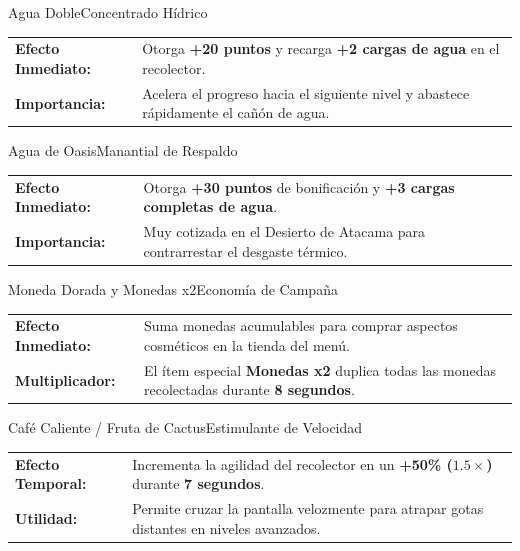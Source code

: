 \documentclass[11pt,a4paper]{article}
\begin{document}
\vspace{0.3cm}

\begin{tarjetaitem}{Agua Doble}{Concentrado Hídrico}
    \begin{tabularx}{\textwidth}{lX}
        \textbf{Efecto Inmediato:} & Otorga \textbf{+20 puntos} y recarga \textbf{+2 cargas de agua} en el recolector. \\
        \textbf{Importancia:} & Acelera el progreso hacia el siguiente nivel y abastece rápidamente el cañón de agua.
    \end{tabularx}
\end{tarjetaitem}

\vspace{0.3cm}

\begin{tarjetaitem}{Agua de Oasis}{Manantial de Respaldo}
    \begin{tabularx}{\textwidth}{lX}
        \textbf{Efecto Inmediato:} & Otorga \textbf{+30 puntos} de bonificación y \textbf{+3 cargas completas de agua}. \\
        \textbf{Importancia:} & Muy cotizada en el Desierto de Atacama para contrarrestar el desgaste térmico.
    \end{tabularx}
\end{tarjetaitem}

\vspace{0.3cm}

\begin{tarjetaitem}{Moneda Dorada y Monedas x2}{Economía de Campaña}
    \begin{tabularx}{\textwidth}{lX}
        \textbf{Efecto Inmediato:} & Suma monedas acumulables para comprar aspectos cosméticos en la tienda del menú. \\
        \textbf{Multiplicador:} & El ítem especial \textbf{Monedas x2} duplica todas las monedas recolectadas durante \textbf{8 segundos}.
    \end{tabularx}
\end{tarjetaitem}

\vspace{0.3cm}

\begin{tarjetaitem}{Café Caliente / Fruta de Cactus}{Estimulante de Velocidad}
    \begin{tabularx}{\textwidth}{lX}
        \textbf{Efecto Temporal:} & Incrementa la agilidad del recolector en un \textbf{+50\% ($1.5\times$)} durante \textbf{7 segundos}. \\
        \textbf{Utilidad:} & Permite cruzar la pantalla velozmente para atrapar gotas distantes en niveles avanzados.
    \end{tabularx}
\end{tarjetaitem}
\end{document}
